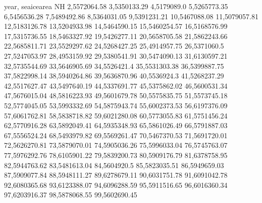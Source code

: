 year,    seaicearea NH
2,5572064.58
3,5350133.29
4,5179089.0
5,5265773.35
6,5456536.28
7,5489492.86
8,5364031.05
9,5391231.21
10,5467088.08
11,5079057.81
12,5183126.78
13,5204933.98
14,5464590.15
15,5460254.57
16,5168576.99
17,5315736.55
18,5463327.92
19,5426277.11
20,5658705.58
21,5862243.66
22,5685811.71
23,5529297.62
24,5268427.25
25,4914957.75
26,5371060.5
27,5247053.97
28,4953159.92
29,5380541.91
30,5474090.13
31,6130597.21
32,5735544.69
33,5646905.69
34,5526421.4
35,5531303.38
36,5399887.75
37,5822998.14
38,5940264.86
39,5636870.96
40,5536924.3
41,5268237.29
42,5517627.47
43,5497640.19
44,5337691.77
45,5375862.02
46,5600531.34
47,5676015.04
48,5816223.93
49,5601679.78
50,5575835.75
51,5573745.18
52,5774045.05
53,5993332.69
54,5875943.74
55,6002373.53
56,6197376.09
57,6061762.81
58,5838718.82
59,6021280.08
60,5773055.83
61,5751456.24
62,5770916.28
63,5892049.41
64,5935348.93
65,5861026.49
66,5791887.03
67,5556524.24
68,5493979.82
69,5569261.47
70,5467370.53
71,5691720.01
72,5626270.81
73,5879070.01
74,5905036.26
75,5996033.04
76,5745763.07
77,5976292.76
78,6105901.22
79,5839200.73
80,5909176.79
81,6378758.95
82,5944763.62
83,5481613.04
84,5604920.5
85,5823035.51
86,5949659.03
87,5909077.84
88,5948111.27
89,6278679.11
90,6031751.78
91,6091042.78
92,6080365.68
93,6123388.07
94,6096288.59
95,5911516.65
96,6016360.34
97,6203916.37
98,5878068.55
99,5602690.45
